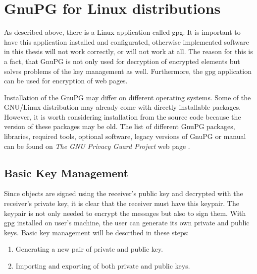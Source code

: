 \section{GnuPG for Linux distributions}
As described above, there is a Linux application called gpg. It is important to have this application installed and configurated, otherwise implemented software in this thesis will not work correctly, or will not work at all. The reason for this is a fact, that GnuPG is not only used for decryption of encrypted elements but solves problems of the key management as well. Furthermore, the gpg application can be used for encryption of web pages.

Installation of the GnuPG may differ on different operating systems. Some of the GNU/Linux distribution may already come with directly installable packages. However, it is worth considering installation from the source code because the version of these packages may be old. The list of different GnuPG packages, libraries, required tools, optional software, legacy versions of GnuPG or manual can be found on \textit{The GNU Privacy Guard Project} web page \cite{GnuPG}.

\subsection{Basic Key Management}
Since objects are signed using the receiver's public key and decrypted with the receiver's private key, it is clear that the receiver must have this keypair. The keypair is not only needed to encrypt the messages but also to sign them. With gpg installed on user's machine, the user can generate its own private and public keys. Basic key management will be described in these steps:
\begin{enumerate}
    \item Generating a new pair of private and public key.
    \item Importing and exporting of both private and public keys.
\end{enumerate}

